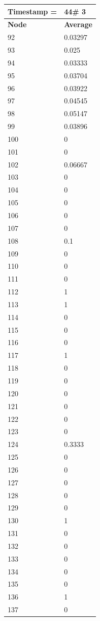 \begin{tabular}{|l||l|}
\hline
\textbf{Timestamp =} & \textbf{44}\# 3\\\hline
	\textbf{Node} & \textbf{Average} \\ \hline
\hline
	92 & 0.03297 \\ \hline
	93 & 0.025 \\ \hline
	94 & 0.03333 \\ \hline
	95 & 0.03704 \\ \hline
	96 & 0.03922 \\ \hline
	97 & 0.04545 \\ \hline
	98 & 0.05147 \\ \hline
	99 & 0.03896 \\ \hline
	100 & 0 \\ \hline
	101 & 0 \\ \hline
	102 & 0.06667 \\ \hline
	103 & 0 \\ \hline
	104 & 0 \\ \hline
	105 & 0 \\ \hline
	106 & 0 \\ \hline
	107 & 0 \\ \hline
	108 & 0.1 \\ \hline
	109 & 0 \\ \hline
	110 & 0 \\ \hline
	111 & 0 \\ \hline
	112 & 1 \\ \hline
	113 & 1 \\ \hline
	114 & 0 \\ \hline
	115 & 0 \\ \hline
	116 & 0 \\ \hline
	117 & 1 \\ \hline
	118 & 0 \\ \hline
	119 & 0 \\ \hline
	120 & 0 \\ \hline
	121 & 0 \\ \hline
	122 & 0 \\ \hline
	123 & 0 \\ \hline
	124 & 0.3333 \\ \hline
	125 & 0 \\ \hline
	126 & 0 \\ \hline
	127 & 0 \\ \hline
	128 & 0 \\ \hline
	129 & 0 \\ \hline
	130 & 1 \\ \hline
	131 & 0 \\ \hline
	132 & 0 \\ \hline
	133 & 0 \\ \hline
	134 & 0 \\ \hline
	135 & 0 \\ \hline
	136 & 1 \\ \hline
	137 & 0 \\ \hline
\end{tabular}

